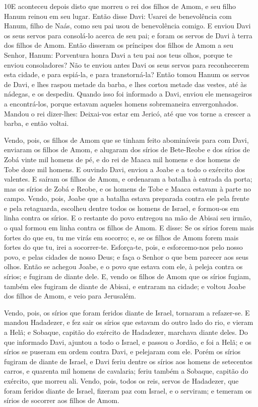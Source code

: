 \medskip

\lettrine{10} E aconteceu depois disto que morreu o rei dos
filhos de Amom, e seu filho Hanum reinou em seu lugar. Então
disse Davi: Usarei de benevolência com Hanum, filho de Naás, como
seu pai usou de benevolência comigo. E enviou Davi os seus servos
para consolá-lo acerca de seu pai; e foram os servos de Davi à terra
dos filhos de Amom. Então disseram os príncipes dos filhos de
Amom a seu Senhor, Hanum: Porventura honra Davi a teu pai aos teus
olhos, porque te enviou consoladores? Não te enviou antes Davi os
seus servos para reconhecerem esta cidade, e para espiá-la, e para
transtorná-la? Então tomou Hanum os servos de Davi, e lhes
raspou metade da barba, e lhes cortou metade das vestes, até às
nádegas, e os despediu. Quando isso foi informado a Davi, enviou
ele mensageiros a encontrá-los, porque estavam aqueles homens
sobremaneira envergonhados. Mandou o rei dizer-lhes: Deixai-vos
estar em Jericó, até que vos torne a crescer a barba, e então
voltai.

Vendo, pois, os filhos de Amom que se tinham feito abomináveis
para com Davi, enviaram os filhos de Amom, e alugaram dos sírios de
Bete-Reobe e dos sírios de Zobá vinte mil homens de pé, e do rei de
Maaca mil homens e dos homens de Tobe doze mil homens. E ouvindo
Davi, enviou a Joabe e a todo o exército dos valentes. E saíram
os filhos de Amom, e ordenaram a batalha à entrada da porta; mas os
sírios de Zobá e Reobe, e os homens de Tobe e Maaca estavam à parte
no campo. Vendo, pois, Joabe que a batalha estava preparada
contra ele pela frente e pela retaguarda, escolheu dentre todos os
homens de Israel, e formou-os em linha contra os sírios. E o
restante do povo entregou na mão de Abisai seu irmão, o qual formou
em linha contra os filhos de Amom. E disse: Se os sírios
forem mais fortes do que eu, tu me virás em socorro; e, se os filhos
de Amom forem mais fortes do que tu, irei a socorrer-te.
Esforça-te, pois, e esforcemo-nos pelo nosso povo, e pelas
cidades de nosso Deus; e faça o Senhor o que bem parecer aos seus
olhos. Então se achegou Joabe, e o povo que estava com ele, à
peleja contra os sírios; e fugiram de diante dele. E, vendo
os filhos de Amom que os sírios fugiam, também eles fugiram de
diante de Abisai, e entraram na cidade; e voltou Joabe dos filhos de
Amom, e veio para Jerusalém.

Vendo, pois, os sírios que foram feridos diante de Israel,
tornaram a refazer-se. E mandou Hadadezer, e fez sair os
sírios que estavam do outro lado do rio, e vieram a Helã; e Sobaque,
capitão do exército de Hadadezer, marchava diante deles. Do
que informado Davi, ajuntou a todo o Israel, e passou o Jordão, e
foi a Helã; e os sírios se puseram em ordem contra Davi, e pelejaram
com ele. Porém os sírios fugiram de diante de Israel, e Davi
feriu dentre os sírios aos homens de setecentos carros, e quarenta
mil homens de cavalaria; feriu também a Sobaque, capitão do
exército, que morreu ali. Vendo, pois, todos os reis, servos
de Hadadezer, que foram feridos diante de Israel, fizeram paz com
Israel, e o serviram; e temeram os sírios de socorrer aos filhos de
Amom.

